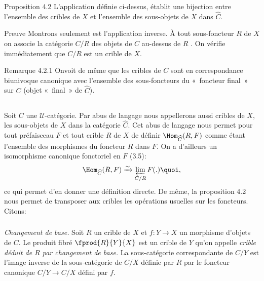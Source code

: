 \begin{enonce*}{Proposition 4.2}
L'application définie ci-dessus, établit une %
bijection entre l'ensemble des cribles de $X$ et l'ensemble des
sous-objets de $X$ dans $\widehat{C}$.
\end{enonce*}

\begin{enonce*}[remark]{Preuve}
Montrons seulement  est l'application inverse. À tout
sous-foncteur $R$ de $X$ on associe la catégorie $C/R$ des objets de
$C$ au-dessus de $R$ . On vérifie
immédiatement que $C/R$ est un crible de $X$.
\end{enonce*}

\begin{enonce*}[remark]{Remarque 4.2.1}
On\pageoriginale voit de même que les cribles de $C$ sont en
correspondance biunivoque canonique avec l'ensemble des
sous-foncteurs du « foncteur final » sur $C$ (objet « final » de $\widehat{C}$).
\end{enonce*}

\setcounter{subsection}{2}
\subsection{}
Soit $C$ une $𝒰$-catégorie. Par abus de langage nous
appellerons aussi cribles de $X$, les sous-objets de $X$ dans la
catégorie $\widehat{C}$. Cet abus de langage nous
permet pour tout préfaisceau $F$ et tout crible $R$ de $X$ de
définir $\Hom_{\widehat{C}}(R,F)$ comme étant
l'ensemble des %
morphismes du foncteur $R$ dans $F$. On a d'ailleurs un isomorphisme
canonique fonctoriel en $F$ (3.5):
$$
\Hom_{\widehat{C}}(R,F)\xrightarrow{\sim}\varprojlim_{C/R}
F(.){\quoi},
$$
ce qui permet d'en donner une définition directe. De même, la proposition 4.2 nous permet de transposer aux
cribles les opérations usuelles sur les foncteurs. Citons:

\subsubsection{}
\emph{Changement de base.} Soit $R$ un crible de $X$ et
$f:Y\rightarrow X$ un morphisme d'objets de $C$. Le produit fibré
$\fprod{R}{Y}{X}$ est un crible de $Y$ qu'on appelle \emph{crible
déduit
  de $R$ par changement de base.} La sous-catégorie correspondante
de $C/Y$ est l'image inverse de la sous-catégorie de $C/X$ définie
par $R$ par le foncteur canonique $C/Y\rightarrow C/X$ défini par
$f$.

